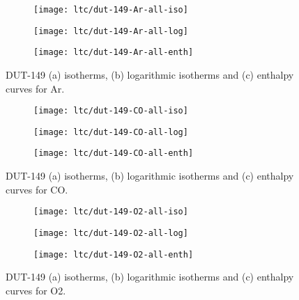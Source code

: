 \begin{figure}[htb]
    \centering
    \begin{subfigure}{0.33\linewidth}
        \texttt{[image: ltc/dut-149-Ar-all-iso]}%
        \caption{}
    \end{subfigure}%
    \begin{subfigure}{0.33\linewidth}
        \texttt{[image: ltc/dut-149-Ar-all-log]}%
        \caption{}
    \end{subfigure}%
    \begin{subfigure}{0.33\linewidth}
        \texttt{[image: ltc/dut-149-Ar-all-enth]}%
        \caption{}
    \end{subfigure}%
    \caption{DUT-149 (a) isotherms, (b) logarithmic isotherms and 
    (c) enthalpy curves for Ar.}%
    \label{appx:dut:fig:dut-149-Ar-ltc}
\end{figure}

\begin{figure}[htb]
    \centering
    \begin{subfigure}{0.33\linewidth}
        \texttt{[image: ltc/dut-149-CO-all-iso]}%
        \caption{}
    \end{subfigure}%
    \begin{subfigure}{0.33\linewidth}
        \texttt{[image: ltc/dut-149-CO-all-log]}%
        \caption{}
    \end{subfigure}%
    \begin{subfigure}{0.33\linewidth}
        \texttt{[image: ltc/dut-149-CO-all-enth]}%
        \caption{}
    \end{subfigure}%
    \caption{DUT-149 (a) isotherms, (b) logarithmic isotherms and 
    (c) enthalpy curves for CO.}%
    \label{appx:dut:fig:dut-149-CO-ltc}
\end{figure}

\begin{figure}[htb]
    \centering
    \begin{subfigure}{0.33\linewidth}
        \texttt{[image: ltc/dut-149-O2-all-iso]}%
        \caption{}
    \end{subfigure}%
    \begin{subfigure}{0.33\linewidth}
        \texttt{[image: ltc/dut-149-O2-all-log]}%
        \caption{}
    \end{subfigure}%
    \begin{subfigure}{0.33\linewidth}
        \texttt{[image: ltc/dut-149-O2-all-enth]}%
        \caption{}
    \end{subfigure}%
    \caption{DUT-149 (a) isotherms, (b) logarithmic isotherms and 
    (c) enthalpy curves for O2.}%
    \label{appx:dut:fig:dut-149-O2-ltc}
\end{figure}

